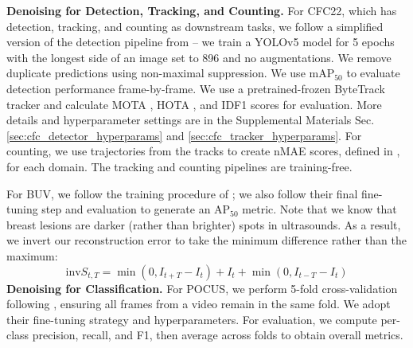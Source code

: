 \textbf{Denoising for Detection, Tracking, and Counting.} For CFC22, which has detection, tracking, and counting as downstream tasks, we follow a simplified version of the detection pipeline from \citet{cfc2022eccv} -- we train a YOLOv5 model for 5 epochs with the longest side of an image set to 896 and no augmentations. We remove duplicate predictions using non-maximal suppression. We use mAP$_{50}$ \cite{map50} to evaluate detection performance frame-by-frame. We use a pretrained-frozen ByteTrack tracker and calculate MOTA \cite{clear}, HOTA \cite{HOTA}, and IDF1 \cite{IDF1} scores for evaluation. More details and hyperparameter settings are in the Supplemental Materials Sec. \ref{sec:cfc_detector_hyperparams} and \ref{sec:cfc_tracker_hyperparams}.  
For counting, we use trajectories from the tracks to create nMAE scores, defined in \citet{cfc2022eccv}, for each domain. The tracking and counting pipelines are training-free.

For BUV, we follow the training procedure of \citet{CVANet}; we also follow their final fine-tuning step and evaluation to generate an AP$_{50}$ metric. Note that we know that breast lesions are darker (rather than brighter) spots in ultrasounds. As a result, we invert our reconstruction error to take the minimum difference rather than the maximum: 
\begin{equation}
\text{inv}S_{t,T} = \min(0, I_{t+T} - I_t) + I_t + \min(0, I_{t-T} - I_t)
\end{equation}
\noindent{}\textbf{Denoising for Classification.} 
For POCUS, we perform 5-fold cross-validation following \citet{born2021accelerating, born2021l2}, ensuring all frames from a video remain in the same fold. We adopt their fine-tuning strategy and hyperparameters. For evaluation, we compute per-class precision, recall, and F1, then average across folds to obtain overall metrics.





